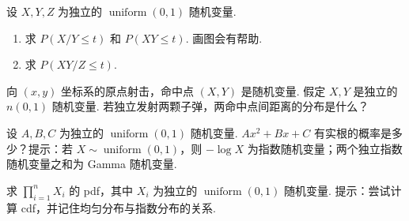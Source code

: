 \begin{exercise}\label{exercise:4.51}
设 $X,Y,Z$ 为独立的 $\operatorname{uniform}(0,1)$ 随机变量.
\begin{enumerate}
\item[(a)] 求 $P(X/Y\le t)$ 和 $P(XY\le t)$. 画图会有帮助.
\item[(b)] 求 $P(XY/Z\le t)$.
\end{enumerate}
\end{exercise}
\begin{exercise}\label{exercise:4.52}
向 $(x,y)$ 坐标系的原点射击，命中点 $(X,Y)$ 是随机变量. 假定 $X,Y$ 是独立的 $n(0,1)$ 随机变量. 若独立发射两颗子弹，两命中点间距离的分布是什么？
\end{exercise}
\begin{exercise}\label{exercise:4.53}
设 $A,B,C$ 为独立的 $\operatorname{uniform}(0,1)$ 随机变量. $Ax^2+Bx+C$ 有实根的概率是多少？提示：若 $X\sim\operatorname{uniform}(0,1)$，则 $-\log X$ 为指数随机变量；两个独立指数随机变量之和为 Gamma 随机变量.
\end{exercise}
\begin{exercise}\label{exercise:4.54}
求 $\prod_{i=1}^nX_i$ 的 pdf，其中 $X_i$ 为独立的 $\operatorname{uniform}(0,1)$ 随机变量. 提示：尝试计算 cdf，并记住均匀分布与指数分布的关系.
\end{exercise}

